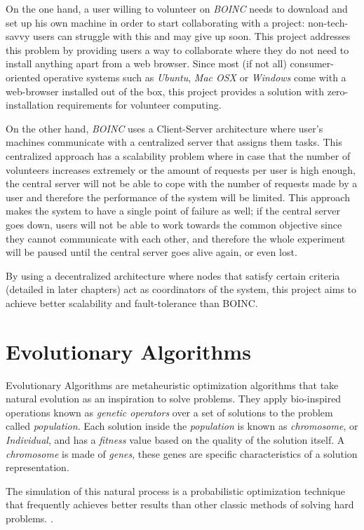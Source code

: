 On the one hand, a user willing to volunteer on \textit{BOINC} needs to download and set up his own machine in order to start collaborating with a project: non-tech-savvy users can struggle with this and may give up soon. This project addresses this problem by providing users a way to collaborate where they do not need to install anything apart from a web browser. Since most (if not all) consumer-oriented operative systems such as \textit{Ubuntu}, \textit{Mac OSX} or \textit{Windows} come with a web-browser installed out of the box, this project provides a solution with zero-installation requirements for volunteer computing.

On the other hand, \textit{BOINC} uses a Client-Server architecture where user's machines communicate with a centralized server that assigns them tasks. This centralized approach has a scalability problem where in case that the number of volunteers increases extremely or the amount of requests per user is high enough, the central server will not be able to cope with the number of requests made by a user and therefore the performance of the system will be limited. This approach makes the system to have a single point of failure as well; if the central server goes down, users will not be able to work towards the common objective since they cannot communicate with each other, and therefore the whole experiment will be paused until the central server goes alive again, or even lost.  

By using a decentralized architecture where nodes that satisfy certain criteria (detailed in later chapters) act as coordinators of the system, this project aims to achieve better scalability and fault-tolerance than BOINC. 


\section{Evolutionary Algorithms}
Evolutionary Algorithms are metaheuristic optimization algorithms that take natural evolution as an inspiration to solve problems. They apply bio-inspired operations known as \textit{genetic operators} over a set of solutions to the problem called \textit{population}. Each solution inside the \textit{population} is known as \textit{chromosome}, or \textit{Individual}, and has a \textit{fitness} value based on the quality of the solution itself. A \textit{chromosome} is made of \textit{genes}, these genes are specific characteristics of a solution representation. 
 
The simulation of this natural process is a probabilistic optimization technique that frequently achieves better results than other classic methods of solving hard problems. \cite{galist}. 

